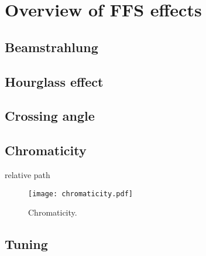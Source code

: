 \chapter{Overview of FFS effects}
\section{Beamstrahlung}
\section{Hourglass effect}
\section{Crossing angle}
\section{Chromaticity}
relative path 
\begin{figure}[!hbt]
\texttt{[image: chromaticity.pdf]}
\centering
\caption{Chromaticity.}\label{f:chrom}
\end{figure}
\section{Tuning}
